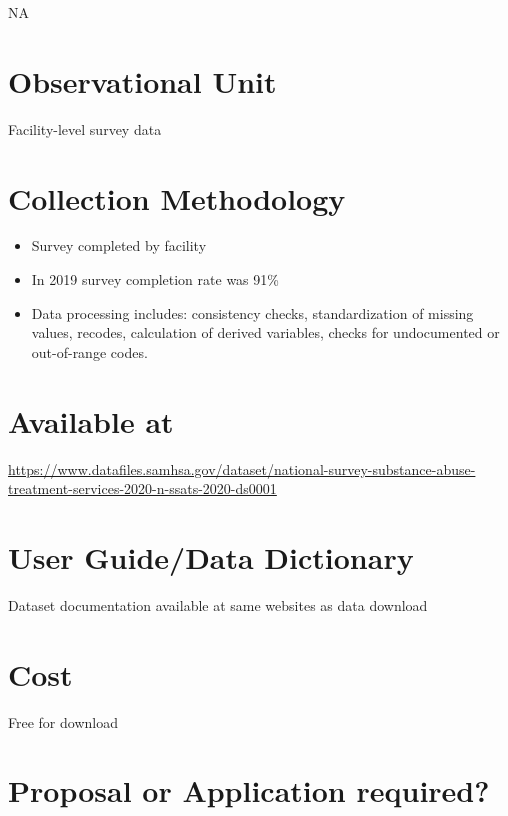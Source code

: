 \documentclass[
]{book}
\providecommand{\tightlist}{%
  \setlength{\itemsep}{0pt}\setlength{\parskip}{0pt}}
\begin{document}
NA

\hypertarget{observational-unit-63}{%
\section{Observational Unit}\label{observational-unit-63}}

Facility-level survey data

\hypertarget{collection-methodology-63}{%
\section{Collection Methodology}\label{collection-methodology-63}}

\begin{itemize}
\tightlist
\item
  Survey completed by facility
\item
  In 2019 survey completion rate was 91\%
\item
  Data processing includes: consistency checks, standardization of missing values, recodes, calculation of derived variables, checks for undocumented or out-of-range codes.
\end{itemize}

\hypertarget{available-at-63}{%
\section{Available at}\label{available-at-63}}

\url{https://www.datafiles.samhsa.gov/dataset/national-survey-substance-abuse-treatment-services-2020-n-ssats-2020-ds0001}

\hypertarget{user-guidedata-dictionary-63}{%
\section{User Guide/Data Dictionary}\label{user-guidedata-dictionary-63}}

Dataset documentation available at same websites as data download

\hypertarget{cost-63}{%
\section{Cost}\label{cost-63}}

Free for download

\hypertarget{proposal-or-application-required-63}{%
\section{Proposal or Application required?}\label{proposal-or-application-required-63}}
\end{document}
